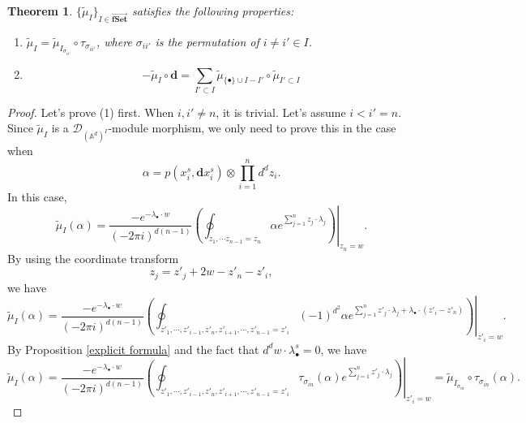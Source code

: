 \documentclass[11pt]{amsart}
\newtheorem{thm}{Theorem}[section]
\theoremstyle{definition}
\theoremstyle{remark}
\numberwithin{equation}{section}
\begin{document}
\begin{thm}
    $\{\tilde{\mu}_{ I}\}_{ I\in \overrightarrow{\mathbf{fSet}}}$ satisfies the following properties:
    \begin{enumerate}
        \item $\tilde{\mu}_{ I}=\tilde{\mu}_{ I_{\sigma_{ii'}}}\circ\tau_{\sigma_{ii'}}$, where $\sigma_{ii'}$ is the permutation of $i\neq i'\in I$.
        \item 
        $$
        -\tilde{\mu}_{ I}\circ \mathbf{d}=\sum_{ I'\subset I}\tilde{\mu}_{\{\bullet\}\cup I- I'}\circ \tilde{\mu}_{ I'\subset I}
        $$
    \end{enumerate}
\end{thm}
\begin{proof}
    Let's prove (1) first. When $i,i'\neq n$, it is trivial. Let's assume $i<i'=n$. Since $\tilde{\mu}_{ I}$ is a $\mathcal{D}_{(\mathbb{A}^{d})^{ I}}$-module morphism, we only need to prove this in the case when 
    $$
    \alpha=p(x_{i}^{s},\mathbf{d}x_{i}^{s})\otimes\prod_{i=1}^{n}d^{d}z_{i}.
    $$
    In this case,
    $$
    \tilde{\mu}_{ I}(\alpha)=\frac{-e^{-\lambda_{\bullet}\cdot w}}{(-2\pi i)^{d(n-1)}}\left.\left(\oint_{z_{1},\cdots z_{n-1}=z_{n}}\alpha e^{\sum_{j=1}^{n}z_{j}\cdot \lambda_{j}}\right)\right|_{z_{n}=w}.
    $$
    By using the coordinate transform
    $$
    z_{j}=z'_{j}+2w-z'_{n}-z'_{i},
    $$
    we have 
    $$
    \tilde{\mu}_{ I}(\alpha)=\frac{-e^{-\lambda_{\bullet}\cdot w}}{(-2\pi i)^{d(n-1)}}\left.\left(\oint_{z'_{1},\cdots, z'_{i-1},z'_{n}, z'_{i+1},\cdots, z'_{n-1}=z'_{i}}(-1)^{d^2}\alpha e^{\sum_{j=1}^{n}z'_{j}\cdot \lambda_{j}+\lambda_{\bullet}\cdot(z'_i-z'_n)}\right)\right|_{z'_{i}=w}.
    $$
    By Proposition \ref{explicit formula} and the fact that $d^{d}w\cdot\lambda_{\bullet}^{s}=0$, we have
    $$
    \tilde{\mu}_{ I}(\alpha)=\frac{-e^{-\lambda_{\bullet}\cdot w}}{(-2\pi i)^{d(n-1)}}\left.\left(\oint_{z'_{1},\cdots, z'_{i-1},z'_{n}, z'_{i+1},\cdots, z'_{n-1}=z'_{i}}\tau_{\sigma_{in}}(\alpha) e^{\sum_{j=1}^{n}z'_{j}\cdot \lambda_{j}}\right)\right|_{z'_{i}=w}=\tilde{\mu}_{ I_{\sigma_{in}}}\circ\tau_{\sigma_{in}}(\alpha).
    $$


\end{proof}
\end{document}
